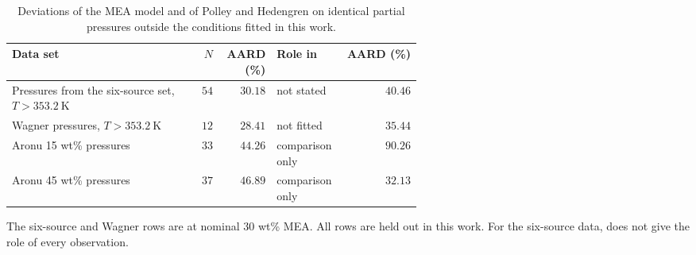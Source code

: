 \begin{table}[!htbp]\small\setlength{\tabcolsep}{3pt}\centering
\caption{Deviations of the MEA model and of Polley and Hedengren \cite{polleyReactiveEPCSAFTModeling2026} on identical  partial pressures outside the conditions fitted in this work.}\label{tab:supplement-mea-extrapolation}
\begin{tabular}{@{}>{\raggedright\arraybackslash}p{0.4600\linewidth}rr>{\raggedright\arraybackslash}p{0.1400\linewidth}r@{}}
\toprule
Data set & $N$ & \makecell[rb]{AARD\\(\%)} & Role in \cite{polleyReactiveEPCSAFTModeling2026} & \makecell[rb]{AARD (\%)\\\cite{polleyReactiveEPCSAFTModeling2026}} \\
\midrule
Pressures from the six-source set, $T>\SI{353.2}{\kelvin}$ \cite{Jou1995,Mamun2005,Xu2011} & $54$ & $30.18$ & not stated & $40.46$ \\
Wagner pressures, $T>\SI{353.2}{\kelvin}$ \cite{wagnerSolubilityCarbonDioxide2013} & $12$ & $28.41$ & not fitted & $35.44$ \\
Aronu 15 wt\% pressures \cite{Aronu2011} & $33$ & $44.26$ & com\-parison only & $90.26$ \\
Aronu 45 wt\% pressures \cite{Aronu2011} & $37$ & $46.89$ & com\-parison only & $32.13$ \\
\bottomrule
\end{tabular}
\par\smallskip\parbox{\linewidth}{\footnotesize\raggedright The six-source and Wagner rows are at nominal 30 wt\% MEA. All rows are held out in this work. For the six-source data, \cite{polleyReactiveEPCSAFTModeling2026} does not give the role of every observation.}
\end{table}
